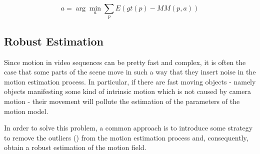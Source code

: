 \begin{equation}
    \label{eq:indirect-estimation}
    a = \arg \min_a \sum_p E(gt(p) - MM(p, a))
\end{equation}

\subsection{Robust Estimation}
Since motion in video sequences can be pretty fast and complex, it is often the case that some parts of the scene move in such a way that they insert noise in the motion estimation process.
In particular, if there are fast moving objects - namely objects manifesting some kind of intrinsic motion which is not caused by camera motion - their movement will pollute the estimation of the parameters of the motion model.

In order to solve this problem, a common approach is to introduce some strategy to remove the outliers () from the motion estimation process and, consequently, obtain a robust estimation of the motion field.